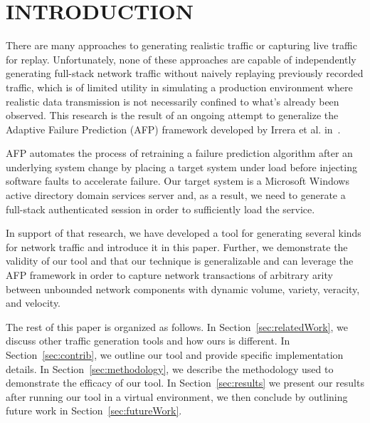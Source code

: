\section{\uppercase{Introduction}}
\noindent There are many approaches to generating realistic traffic or
capturing live traffic for replay.  Unfortunately, none of these approaches are
capable of independently generating full-stack network traffic without naively
replaying previously recorded traffic, which is of limited utility in
simulating a production environment where realistic data transmission is not
necessarily confined to what's already been observed.  This research is the
result of an ongoing attempt to generalize the Adaptive Failure Prediction
(AFP) framework developed by Irrera et al. in~\cite{irrera2015}.

AFP automates the process of retraining a failure prediction algorithm after an
underlying system change by placing a target system under load before
injecting software faults to accelerate failure.  Our target system is a
Microsoft Windows active directory domain services server and, as a result, we
need to generate a full-stack authenticated session in order to sufficiently
load the service.  

In support of that research, we have developed a tool for generating several
kinds for network traffic and introduce it in this paper.  Further, we
demonstrate the validity of our tool and that our technique is generalizable
and can leverage the AFP framework in order to capture network transactions of
arbitrary arity between unbounded network components with dynamic volume,
variety, veracity, and velocity.

The rest of this paper is organized as follows.  In
Section~\ref{sec:relatedWork}, we discuss other traffic generation tools and
how ours is different.  In Section~\ref{sec:contrib}, we outline our tool and
provide specific implementation details.  In Section~\ref{sec:methodology}, we
describe the methodology used to demonstrate the efficacy of our tool.  In
Section~\ref{sec:results} we present our results after running our tool in a
virtual environment, we then conclude by outlining future work in
Section~\ref{sec:futureWork}.
